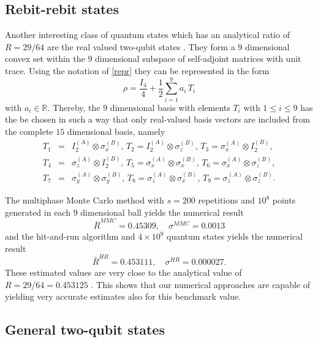 \documentclass[12pt]{iopart}
\begin{document}
\subsection{Rebit-rebit states} \label{sec:rebqb}

Another interesting class of quantum states which has an analytical ratio of $R=29/64$ are the real valued two-qubit states \cite{Lovas}. They form a $9$ dimensional convex set within 
the $9$ dimensional subspace of self-adjoint matrices with unit trace. Using the notation of  \eqref{repr} they can be represented in the form
\begin{equation}
\rho = \frac{I_4}{4} + \frac{1}{2}\sum_{i=1}^9 a_i\,T_i
\label{Xs}
\end{equation}
with $a_i\in \mathbb{R}$. 
Thereby, the $9$ dimensional basis with elements $T_i$ with $1\leq i \leq 9$ has the be chosen in such a way that only real-valued basis vectors are included from the complete $15$ dimensional basis, namely
\begin{eqnarray}
T_1&=&I^{(A)}_2 \otimes \sigma^{(B)}_x, \, T_2=I^{(A)}_2 \otimes \sigma^{(B)}_z, \, T_3=\sigma^{(A)}_x\otimes I^{(B)}_2, \nonumber \\
T_4&=&\sigma^{(A)}_z\otimes I^{(B)}_2, \, T_5=\sigma^{(A)}_x\otimes \sigma^{(B)}_x, \, T_6=\sigma^{(A)}_x \otimes \sigma^{(B)}_z, \nonumber \\
T_7&=&\sigma^{(A)}_y\otimes \sigma^{(B)}_y, \, T_8=\sigma^{(A)}_z \otimes \sigma^{(B)}_x, \, T_9=\sigma^{(A)}_z \otimes \sigma^{(B)}_z. \nonumber
\end{eqnarray}
  
The multiphase Monte Carlo method with $s=200$ repetitions and $10^8$ points generated in each $9$ dimensional ball yields the numerical result
\begin{equation}
 \bar{R}^{MMC}=0.45309, \quad \sigma^{MMC}=0.0013 
\end{equation}
and the hit-and-run algorithm and $4 \times 10^9$ quantum states yields the numerical result
\begin{equation}
 \bar{R}^{HR}=0.453111, \quad \sigma^{HR}=0.000027. 
\end{equation}
These estimated values are very close to the analytical value of $R=29/64=0.453125$ \cite{Lovas}. This shows that our numerical approaches are capable of yielding  very accurate estimates also for this benchmark value. 

\subsection{General two-qubit states}\label{sec:tqb}
\end{document}
